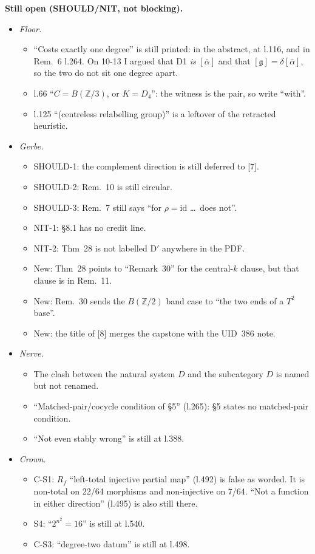 \documentclass[10pt]{article}
\newcommand{\Z}{\mathbb{Z}}
\begin{document}
\textbf{Still open (SHOULD/NIT, not blocking).}
\begin{itemize}
\item \emph{Floor.}
  \begin{itemize}
  \item ``Costs exactly one degree'' is still printed: in the abstract, at l.116, and in Rem.~6 l.264. On 10-13 I argued that D1 \emph{is} $[\bar\alpha]$ and that $[\mathfrak g]=\delta[\bar\alpha]$, so the two do not sit one degree apart.
  \item l.66 ``$C=B(\Z/3)$, or $K=D_4$'': the witness is the pair, so write ``with''.
  \item l.125 ``(centreless relabelling group)'' is a leftover of the retracted heuristic.
  \end{itemize}
\item \emph{Gerbe.}
  \begin{itemize}
  \item SHOULD-1: the complement direction is still deferred to [7].
  \item SHOULD-2: Rem.~10 is still circular.
  \item SHOULD-3: Rem.~7 still says ``for $\rho=\mathrm{id}$ \dots\ does not''.
  \item NIT-1: \S8.1 has no credit line.
  \item NIT-2: Thm~28 is not labelled D$'$ anywhere in the PDF.
  \item New: Thm~28 points to ``Remark~30'' for the central-$k$ clause, but that clause is in Rem.~11.
  \item New: Rem.~30 sends the $B(\Z/2)$ band case to ``the two ends of a $T^2$ base''.
  \item New: the title of [8] merges the capstone with the UID~386 note.
  \end{itemize}
\item \emph{Nerve.}
  \begin{itemize}
  \item The clash between the natural system $D$ and the subcategory $D$ is named but not renamed.
  \item ``Matched-pair/cocycle condition of \S5'' (l.265): \S5 states no matched-pair condition.
  \item ``Not even stably wrong'' is still at l.388.
  \end{itemize}
\item \emph{Crown.}
  \begin{itemize}
  \item C-S1: $R_f$ ``left-total injective partial map'' (l.492) is false as worded. It is non-total on 22/64 morphisms and non-injective on 7/64. ``Not a function in either direction'' (l.495) is also still there.
  \item S4: ``$2^{n^2}=16$'' is still at l.540.
  \item C-S3: ``degree-two datum'' is still at l.498.
  \end{itemize}
\end{itemize}
\end{document}
